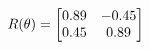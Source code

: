 \documentclass[preview]{standalone}
\begin{document}
\begin{align*}
\special{dvisvgm:raw <g id='unique000'>}R(\theta) = \begin{bmatrix}0.89 & -0.45\\0.45 & 0.89\end{bmatrix}\special{dvisvgm:raw </g>}
\end{align*}
\end{document}
